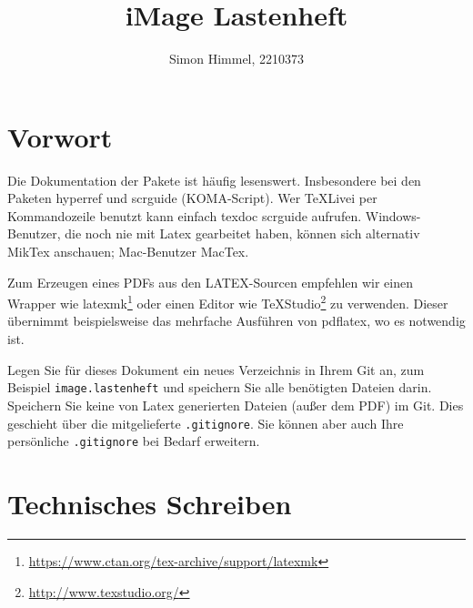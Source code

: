 \documentclass[parskip=full]{scrartcl}
\title{iMage Lastenheft}
\author{Simon Himmel, 2210373}
\begin{document}
\maketitle

%
%
\section{Vorwort}
Die Dokumentation der Pakete ist häufig lesenswert.
Insbesondere bei den Paketen hyperref und scrguide (KOMA-Script).
Wer TeXLivei per Kommandozeile benutzt kann einfach texdoc scrguide aufrufen.
Windows-Benutzer, die noch nie mit Latex gearbeitet haben, können sich alternativ MikTex anschauen; Mac-Benutzer MacTex.

Zum Erzeugen eines PDFs aus den LATEX-Sourcen empfehlen wir einen Wrapper wie latexmk\footnote{\url{https://www.ctan.org/tex-archive/support/latexmk}} oder einen Editor wie TeXStudio\footnote{\url{http://www.texstudio.org/}} zu verwenden.
Dieser übernimmt beispielsweise das mehrfache Ausführen von pdflatex, wo es notwendig ist.

Legen Sie für dieses Dokument ein neues Verzeichnis in Ihrem Git an, zum Beispiel \texttt{image.lastenheft} und speichern Sie alle benötigten Dateien darin.
Speichern Sie keine von Latex generierten Dateien (außer dem PDF) im Git.
Dies geschieht über die mitgelieferte \texttt{.gitignore}.
Sie können aber auch Ihre persönliche \texttt{.gitignore} bei Bedarf erweitern.

\section{Technisches Schreiben}
\end{document}
